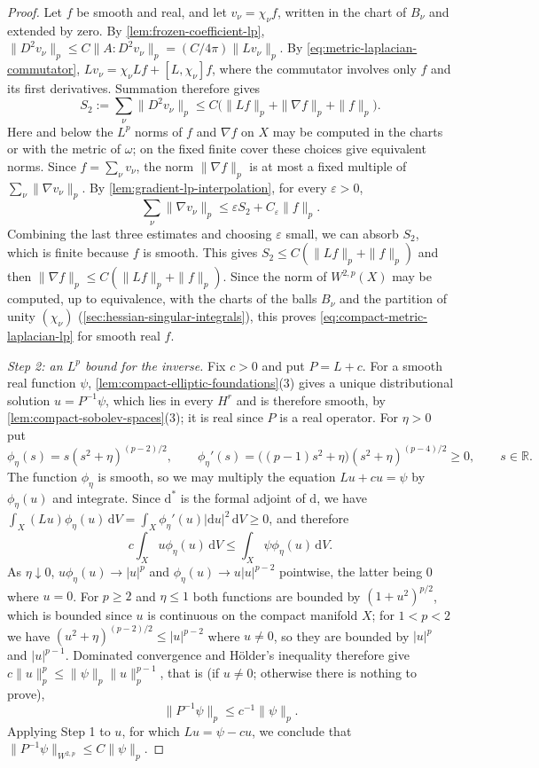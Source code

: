 \begin{proof}
Let $f$ be smooth and real, and let $v_\nu=\chi_\nu f$, written in the chart of $B_\nu$ and extended by zero. By \cref{lem:frozen-coefficient-lp}, $\|D^2v_\nu\|_p\leq C\|A:D^2v_\nu\|_p=(C/4\pi)\|Lv_\nu\|_p$. By \eqref{eq:metric-laplacian-commutator}, $Lv_\nu=\chi_\nu Lf+[L,\chi_\nu]f$, where the commutator involves only $f$ and its first derivatives. Summation therefore gives
\[
 S_2:=\sum_\nu\|D^2v_\nu\|_p
 \leq C\bigl(\|Lf\|_p+\|\nabla f\|_p+\|f\|_p\bigr).
\]
Here and below the $L^p$ norms of $f$ and $\nabla f$ on $X$ may be computed in the charts or with the metric of $\omega$; on the fixed finite cover these choices give equivalent norms. Since $f=\sum_\nu v_\nu$, the norm $\|\nabla f\|_p$ is at most a fixed multiple of $\sum_\nu\|\nabla v_\nu\|_p$. By \cref{lem:gradient-lp-interpolation}, for every $\varepsilon>0$,
\[
 \sum_\nu\|\nabla v_\nu\|_p\leq\varepsilon S_2+C_\varepsilon\|f\|_p.
\]
Combining the last three estimates and choosing $\varepsilon$ small, we can absorb $S_2$, which is finite because $f$ is smooth. This gives $S_2\leq C(\|Lf\|_p+\|f\|_p)$ and then $\|\nabla f\|_p\leq C(\|Lf\|_p+\|f\|_p)$. Since the norm of $W^{2,p}(X)$ may be computed, up to equivalence, with the charts of the balls $B_\nu$ and the partition of unity $(\chi_\nu)$ (\cref{sec:hessian-singular-integrals}), this proves \eqref{eq:compact-metric-laplacian-lp} for smooth real $f$.

\emph{Step 2: an $L^p$ bound for the inverse.} Fix $c>0$ and put $P=L+c$. For a smooth real function $\psi$, \cref{lem:compact-elliptic-foundations}(3) gives a unique distributional solution $u=P^{-1}\psi$, which lies in every $H^r$ and is therefore smooth, by \cref{lem:compact-sobolev-spaces}(3); it is real since $P$ is a real operator. For $\eta>0$ put
\[
 \phi_\eta(s)=s(s^2+\eta)^{(p-2)/2},
 \qquad
 \phi_\eta'(s)=
 \bigl((p-1)s^2+\eta\bigr)(s^2+\eta)^{(p-4)/2}\geq0,
 \qquad s\in\mathbb R.
\]
The function $\phi_\eta$ is smooth, so we may multiply the equation $Lu+cu=\psi$ by $\phi_\eta(u)$ and integrate. Since $\mathrm d^*$ is the formal adjoint of $\mathrm d$, we have $\int_X(Lu)\phi_\eta(u)\,\mathrm dV=\int_X\phi_\eta'(u)|\mathrm du|^2\,\mathrm dV\geq0$, and therefore
\[
 c\int_Xu\phi_\eta(u)\,\mathrm dV\leq\int_X\psi\phi_\eta(u)\,\mathrm dV.
\]
As $\eta\downarrow0$, $u\phi_\eta(u)\to|u|^p$ and $\phi_\eta(u)\to u|u|^{p-2}$ pointwise, the latter being $0$ where $u=0$. For $p\geq2$ and $\eta\leq1$ both functions are bounded by $(1+u^2)^{p/2}$, which is bounded since $u$ is continuous on the compact manifold $X$; for $1<p<2$ we have $(u^2+\eta)^{(p-2)/2}\leq|u|^{p-2}$ where $u\neq0$, so they are bounded by $|u|^p$ and $|u|^{p-1}$. Dominated convergence and H\"older's inequality therefore give $c\|u\|_p^p\leq\|\psi\|_p\|u\|_p^{p-1}$, that is (if $u\neq0$; otherwise there is nothing to prove),
\[
 \|P^{-1}\psi\|_p\leq c^{-1}\|\psi\|_p.
\]
Applying Step 1 to $u$, for which $Lu=\psi-cu$, we conclude that $\|P^{-1}\psi\|_{W^{2,p}}\leq C\|\psi\|_p$.


\end{proof}
